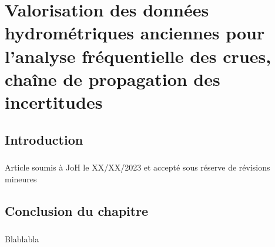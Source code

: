 \chapter{Valorisation des données hydrométriques anciennes pour l’analyse fréquentielle des crues, chaîne de propagation des incertitudes}


\section{Introduction}

\paragraph{} Article soumis à JoH le XX/XX/2023 et accepté sous réserve de révisions mineures

\newpage







\section{Conclusion du chapitre}

\paragraph{} Blablabla
